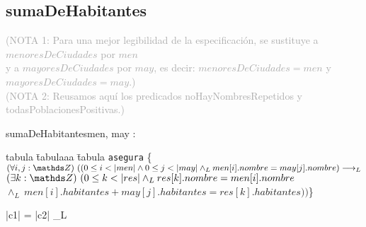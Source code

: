 \documentclass[10pt,a4paper]{article}
\begin{document}
{}




\subsection{sumaDeHabitantes}

\textcolor{darkgray}{(\textsc{NOTA 1}: Para una mejor legibilidad de la especificación, se sustituye a $menoresDeCiudades$ por $men$ \\
y a $mayoresDeCiudades$ por $may$, es decir: $menoresDeCiudades = men$ y $mayoresDeCiudades = may$.)} \\
\textcolor{darkgray}{(\textsc{NOTA 2}: Reusamos aquí los predicados \textsf{noHayNombresRepetidos} y \textsf{todasPoblacionesPositivas}.)}

\begin{proc}{sumaDeHabitantes}{\In men, may : }{}
	\begin{tabbing}
    tabula \=tabulaaa \=tabula \kill
    \> \texttt{asegura} \{$(\forall i, j : \ent) \ ((0 \leq i < |men| \land 0 \leq j < |may| \land_L men[i].nombre = may[j].nombre) \longrightarrow_L$ \\
    \> \> $(\exists k : \ent) \ (0 \leq k < |res| \land_L res[k].nombre = men[i].nombre$  \\
    \> \> $\land_L \ men[i].habitantes + may[j].habitantes = res[k].habitantes))$\}
    \end{tabbing}
\end{proc}    

{|c1| = |c2| \land_L }
\end{document}

